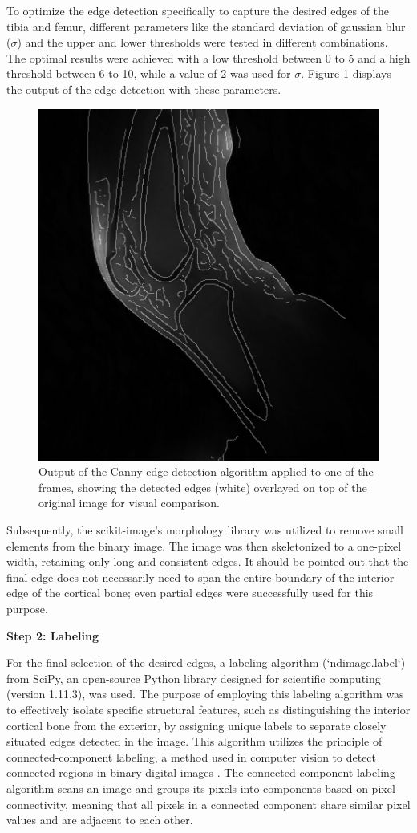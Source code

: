 \documentclass{micro-econ-thesis}
\begin{document}
To optimize the edge detection specifically to capture the desired edges of the tibia and femur, different parameters like the standard deviation of gaussian blur ($\sigma$) and the upper and lower thresholds were tested in different combinations. The optimal results were achieved with a low threshold between 0 to 5 and a high threshold between 6 to 10, while a value of 2 was used for $\sigma$. Figure \ref{fig:edgemitimg} displays the output of the edge detection with these parameters.  
\begin{figure}[H]
	\centering
	\includegraphics[width=0.7\linewidth]{edge_new}
	\caption{Output of the Canny edge detection algorithm applied to one of the frames, showing the detected edges (white) overlayed on top of the original image for visual comparison.}
	\label{fig:edgemitimg}
\end{figure}


Subsequently, the scikit-image's morphology library was utilized to remove small elements from the binary image. The image was then skeletonized to a one-pixel width, retaining only long and consistent edges. It should be pointed out that the final edge does not necessarily need to span the entire boundary of the interior edge of the cortical bone; even partial edges were successfully used for this purpose.  

\textbf{Step 2: Labeling}

For the final selection of the desired edges, a labeling algorithm (`ndimage.label`) from SciPy, an open-source Python library designed for scientific computing (version 1.11.3), was used. The purpose of employing this labeling algorithm was to effectively isolate specific structural features, such as distinguishing the interior cortical bone from the exterior, by assigning unique labels to separate closely situated edges detected in the image. This algorithm utilizes the principle of connected-component labeling, a method used in computer vision to detect connected regions in binary digital images \parencite{dillencourt_general_1992}. The connected-component labeling algorithm scans an image and groups its pixels into components based on pixel connectivity, meaning that all pixels in a connected component share similar pixel values and are adjacent to each other.
\end{document}
